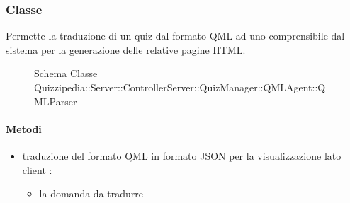 \subsubsection{Classe }
Permette la traduzione di un quiz dal formato QML ad uno comprensibile dal sistema per la generazione delle relative pagine HTML.
\begin{figure}[H]
\centering
\noindent{}
\caption[Schema Classe QMLParser]{Schema Classe Quizzipedia::Server::ControllerServer::QuizManager::QMLAgent::QMLParser}
\end{figure}
\paragraph{Metodi}
\begin{itemize}
\item {}
\newline
traduzione del formato QML in formato JSON per la visualizzazione lato client
\newline
{} :
\begin{itemize}
\item {}
\newline
la domanda da tradurre
\end{itemize}
\end{itemize}
